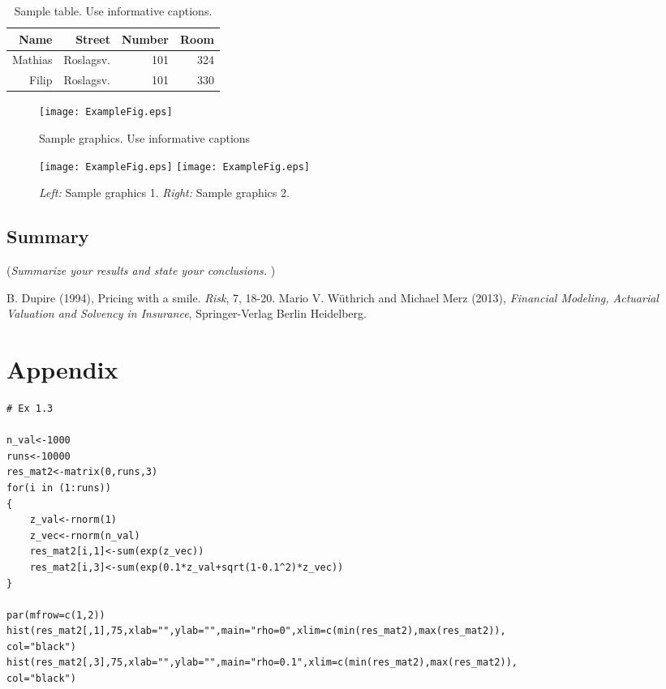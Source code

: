 \documentclass[11pt]{article}
\begin{document}
\begin{table}[!ht]
\center
\begin{tabular}{rrr|r}
Name & Street & Number & Room\\ 
\hline
Mathias & Roslagsv. & 101 & 324\\
Filip & Roslagsv. & 101 & 330\\
\hline
\end{tabular}
\caption{Sample table. Use informative captions.} \label{tab:sampletab}
\end{table}


 \begin{figure}[!ht]
 \center
  \texttt{[image: ExampleFig.eps]}
  \caption{Sample graphics. Use informative captions}
  \label{fig:samplefig1}
\end{figure}


 \begin{figure}[!ht]
 \center
  \texttt{[image: ExampleFig.eps]}  \texttt{[image: ExampleFig.eps]}
  \caption{\emph{Left:} Sample graphics 1. \emph{Right:} Sample graphics 2.}
  \label{fig:samplefig2}
\end{figure}


\subsection*{Summary}
({\it Summarize your results and state your conclusions. })



\begin{thebibliography}{99}
B. Dupire (1994),
Pricing with a smile.
\emph{Risk}, 7, 18-20.
  Mario V. W\"{u}thrich and Michael Merz (2013),
  \emph{Financial Modeling, Actuarial Valuation and Solvency in Insurance},
  Springer-Verlag Berlin Heidelberg.
\end{thebibliography}


\section*{Appendix}

\begin{verbatim}
# Ex 1.3

n_val<-1000
runs<-10000
res_mat2<-matrix(0,runs,3)
for(i in (1:runs))
{
	z_val<-rnorm(1)
	z_vec<-rnorm(n_val)
	res_mat2[i,1]<-sum(exp(z_vec))
	res_mat2[i,3]<-sum(exp(0.1*z_val+sqrt(1-0.1^2)*z_vec))
}

par(mfrow=c(1,2))
hist(res_mat2[,1],75,xlab="",ylab="",main="rho=0",xlim=c(min(res_mat2),max(res_mat2)),
col="black")
hist(res_mat2[,3],75,xlab="",ylab="",main="rho=0.1",xlim=c(min(res_mat2),max(res_mat2)),
col="black")
\end{verbatim}
\end{document}
